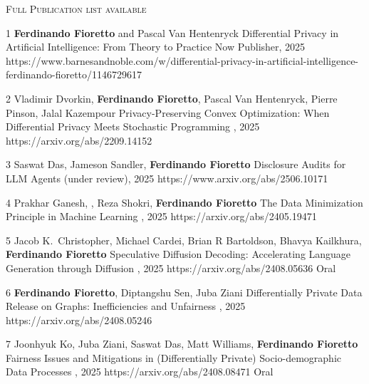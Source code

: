 \documentclass[localFont,alternative]{documentMETADATA}
\begin{document}
{\textsc{Full Publication list available  }}

\begin{pubs}
	
	\confentryShort
	{1}
	{{\bf Ferdinando Fioretto} and Pascal Van Hentenryck}
	{Differential Privacy in Artificial Intelligence: From Theory to Practice}
	{Now Publisher, 2025}
	{https://www.barnesandnoble.com/w/differential-privacy-in-artificial-intelligence-ferdinando-fioretto/1146729617}

	\confentryShort
	{2} 
	{Vladimir Dvorkin, {\bf Ferdinando Fioretto}, Pascal Van Hentenryck, Pierre Pinson, Jalal Kazempour}
	{Privacy-Preserving Convex Optimization: When Differential Privacy Meets Stochastic Programming}
	{, 2025}
	{https://arxiv.org/abs/2209.14152}

	\confentryShort
	{3}
	{{Saswat Das}, {Jameson Sandler}, {\bf Ferdinando Fioretto}}
	{Disclosure Audits for LLM Agents}
	{ (under review), 2025}
	{https://www.arxiv.org/abs/2506.10171}

\confentryShort
	{4}
	{Prakhar Ganesh, , Reza Shokri, {\bf Ferdinando Fioretto}}
	{The Data Minimization Principle in Machine Learning}
	{\procFAccT, 2025}
	{https://arxiv.org/abs/2405.19471}

\confentryShortAwd
	{5}
	{{Jacob K.~Christopher}, {Michael Cardei}, Brian R Bartoldson, Bhavya Kailkhura, {\bf Ferdinando Fioretto}}
	{Speculative Diffusion Decoding: Accelerating Language Generation through Diffusion}
	{\procNAACL, 2025}
	{https://arxiv.org/abs/2408.05636}
	{Oral}

\confentryShort
	{6}
	{{\bf Ferdinando Fioretto}, Diptangshu Sen, Juba Ziani}
	{Differentially Private Data Release on Graphs: Inefficiencies and Unfairness}
	{\procAISTATS, 2025}
	{https://arxiv.org/abs/2408.05246}

\confentryShortAwd
	{7}
	{{Joonhyuk Ko}, Juba Ziani, {Saswat Das}, Matt Williams, {\bf Ferdinando Fioretto}}
	{Fairness Issues and Mitigations in (Differentially Private) Socio-demographic Data Processes}
	{\procAAAI, 2025}
	{https://arxiv.org/abs/2408.08471}
	{Oral}



\end{pubs}
\end{document}
